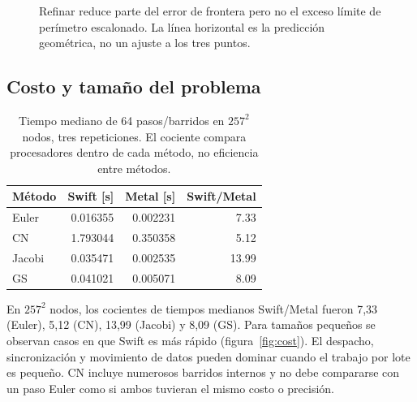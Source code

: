 \documentclass[11pt,a4paper]{article}
\begin{document}
\begin{figure}[tbp]\centering{}
\caption{Refinar reduce parte del error de frontera pero no el exceso límite de perímetro escalonado. La línea horizontal es la predicción geométrica, no un ajuste a los tres puntos.}\label{fig:robin}\end{figure}

\subsection{Costo y tamaño del problema}
\begin{table}[tbp]\centering\small
\caption{Tiempo mediano de 64 pasos/barridos en $257^2$ nodos, tres repeticiones. El cociente compara procesadores dentro de cada método, no eficiencia entre métodos.}\label{tab:timing}
\begin{tabular}{@{}lrrr@{}}\toprule
Método & Swift [s] & Metal [s] & Swift/Metal\\\midrule
Euler & 0.016355 & 0.002231 & 7.33\\
CN & 1.793044 & 0.350358 & 5.12\\
Jacobi & 0.035471 & 0.002535 & 13.99\\
GS & 0.041021 & 0.005071 & 8.09\\
\bottomrule\end{tabular}\end{table}

En $257^2$ nodos, los cocientes de tiempos medianos Swift/Metal fueron 7,33 (Euler), 5,12 (CN), 13,99 (Jacobi) y 8,09 (GS). Para tamaños pequeños se observan casos en que Swift es más rápido (figura~\ref{fig:cost}). El despacho, sincronización y movimiento de datos pueden dominar cuando el trabajo por lote es pequeño. CN incluye numerosos barridos internos y no debe compararse con un paso Euler como si ambos tuvieran el mismo costo o precisión.
\end{document}
